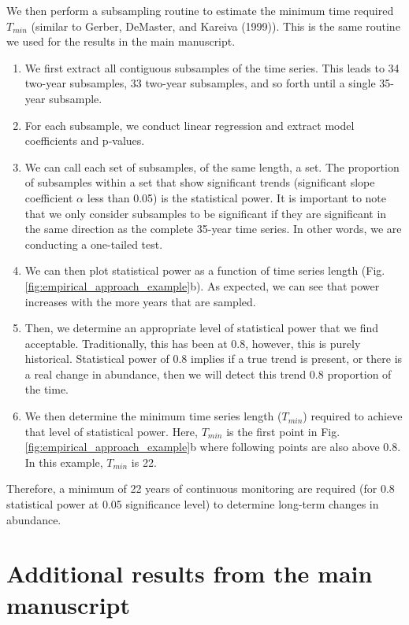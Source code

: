 \documentclass[12pt,]{article}
\begin{document}
We then perform a subsampling routine to estimate the minimum time
required \(T_{min}\) (similar to Gerber, DeMaster, and Kareiva (1999)).
This is the same routine we used for the results in the main manuscript.

\begin{enumerate}
  \item We first extract all contiguous subsamples of the time series. This leads to 34 two-year subsamples, 33 two-year subsamples, and so forth until a single 35-year subsample.  
  \item For each subsample, we conduct linear regression and extract model coefficients and p-values.    \item We can call each set of subsamples, of the same length, a set. The proportion of subsamples within a set that show significant trends (significant slope coefficient $\alpha$ less than 0.05) is the statistical power. It is important to note that we only consider subsamples to be significant if they are significant in the same direction as the complete 35-year time series. In other words, we are conducting a one-tailed test.
  \item We can then plot statistical power as a function of time series length (Fig. \ref{fig:empirical_approach_example}b). As expected, we can see that power increases with the more years that are sampled.
  \item  Then, we determine an appropriate level of statistical power that we find acceptable. Traditionally, this has been at 0.8, however, this is purely historical. Statistical power of 0.8 implies if a true trend is present, or there is a real change in abundance, then we will detect this trend 0.8 proportion of the time. 
  \item We then determine the minimum time series length ($T_{min}$) required to achieve that level of statistical power. Here, $T_{min}$ is the first point in Fig. \ref{fig:empirical_approach_example}b where following points are also above 0.8. In this example, $T_{min}$ is 22. 
\end{enumerate}

Therefore, a minimum of 22 years of continuous monitoring are required
(for 0.8 statistical power at 0.05 significance level) to determine
long-term changes in abundance.

\section{Additional results from the main
manuscript}\label{additional-results-from-the-main-manuscript}
\end{document}
